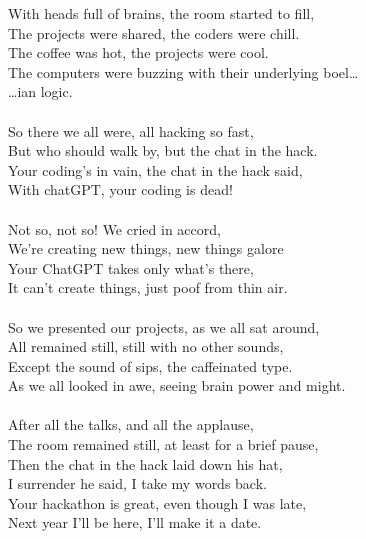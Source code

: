 \documentclass{article}
\begin{document}
{{With heads full of brains, the room started to fill,  \\
The projects were shared, the coders were chill. \\
The coffee was hot, the projects were cool. \\
The computers were buzzing with their underlying boel… \\
…ian logic.  \\
\\
So there we all were, all hacking so fast, \\
But who should walk by, but the chat in the hack. \\
Your coding's in vain, the chat in the hack said, \\
With chatGPT, your coding is dead! \\
\\
Not so, not so! We cried in accord, \\
We're creating new things, new things galore \\
Your ChatGPT takes only what's there, \\
It can't create things, just poof from thin air. \\
\\
So we presented our projects, as we all sat around, \\
All remained still, still with no other sounds, \\
Except the sound of sips, the caffeinated type. \\
As we all looked in awe, seeing brain power and might. \\
\\
After all the talks, and all the applause, \\
The room remained still, at least for a brief pause, \\
Then the chat in the hack laid down his hat, \\
I surrender he said, I take my words back. \\
Your hackathon is great, even though I was late, \\
Next year I'll be here, I'll make it a date. \\
}}
\end{document}

